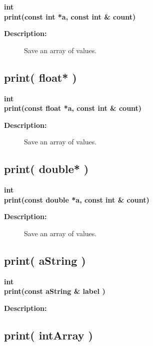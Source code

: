 \begin{flushleft} \textbf{%
int  \\ 
\settowidth{\FortranIOIncludeArgIndent}{print(}%
print(const int *a, const int \& count)
}\end{flushleft}
\begin{description}
\item[{\bf Description:}] 
   Save an array of values.
\end{description}
\subsection{print( float* )}
 
\begin{flushleft} \textbf{%
int  \\ 
\settowidth{\FortranIOIncludeArgIndent}{print(}%
print(const float *a, const int \& count)
}\end{flushleft}
\begin{description}
\item[{\bf Description:}] 
   Save an array of values.
\end{description}
\subsection{print( double* )}
 
\begin{flushleft} \textbf{%
int  \\ 
\settowidth{\FortranIOIncludeArgIndent}{print(}%
print(const double *a, const int \& count)
}\end{flushleft}
\begin{description}
\item[{\bf Description:}] 
   Save an array of values.
\end{description}
\subsection{print( aString )}
 
\begin{flushleft} \textbf{%
int  \\ 
\settowidth{\FortranIOIncludeArgIndent}{print(}%
print(const aString \& label )
}\end{flushleft}
\begin{description}
\item[{\bf Description:}] 
\end{description}
\subsection{print( intArray )}
 
